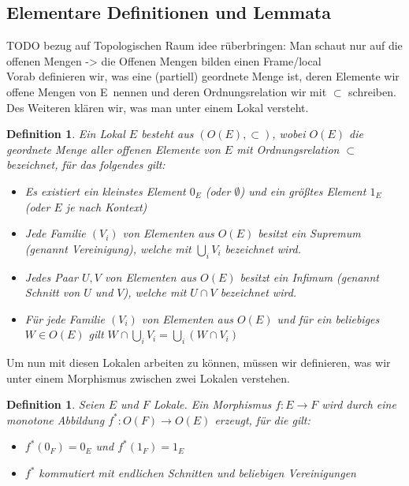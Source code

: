 \documentclass{article}
\newtheorem{definition}[satz]{Definition}
\begin{document}
\subsection{Elementare Definitionen und Lemmata}
TODO bezug auf Topologischen Raum idee rüberbringen: Man schaut nur auf die offenen Mengen -> die Offenen Mengen bilden einen Frame/local 
\\

Vorab definieren wir, was eine (partiell) geordnete Menge ist, deren Elemente wir \grqq offene Mengen von E\glqq~nennen und deren Ordnungsrelation wir mit $\subset$ schreiben. Des Weiteren klären wir, was man unter einem Lokal versteht.
\begin{definition}
    Ein Lokal $E$ besteht aus $(O(E),\subset)$, wobei $O(E)$ die geordnete Menge aller offenen Elemente von $E$ mit Ordnungsrelation $\subset$ bezeichnet, für das folgendes gilt:
    \begin{itemize}
        \item Es existiert ein kleinstes Element $0_E$ (oder $\emptyset$) und ein größtes Element $1_E$ (oder $E$ je nach Kontext)
        \item Jede Familie $(V_i)$ von Elementen aus $O(E)$ besitzt ein Supremum (genannt Vereinigung), welche mit $\bigcup_i V_i$ bezeichnet wird.
        \item  Jedes Paar $U,V$ von Elementen aus $O(E)$ besitzt ein Infimum (genannt Schnitt von $U$ und $V$), welche mit $U\cap V$ bezeichnet wird.
        \item  Für jede Familie $(V_i)$ von Elementen aus $O(E)$ und für ein beliebiges $W\in O(E)$ gilt $W\cap\bigcup_i V_i=\bigcup_i (W\cap V_i)$
    \end{itemize}
    
\end{definition}
Um nun mit diesen Lokalen arbeiten zu können, müssen wir definieren, was wir unter einem Morphismus zwischen zwei Lokalen verstehen.
\begin{definition}
    Seien $E$ und $F$ Lokale. Ein Morphismus $f:E\to F$ wird durch eine monotone Abbildung $f^*:O(F)\to O(E)$ erzeugt, für die gilt:
    \begin{itemize}
    \item $f^*(0_F)=0_E$ und $f^*(1_F)=1_E$
    \item $f^*$ kommutiert mit endlichen Schnitten und beliebigen Vereinigungen
    \end{itemize}
\end{definition}
\end{document}
